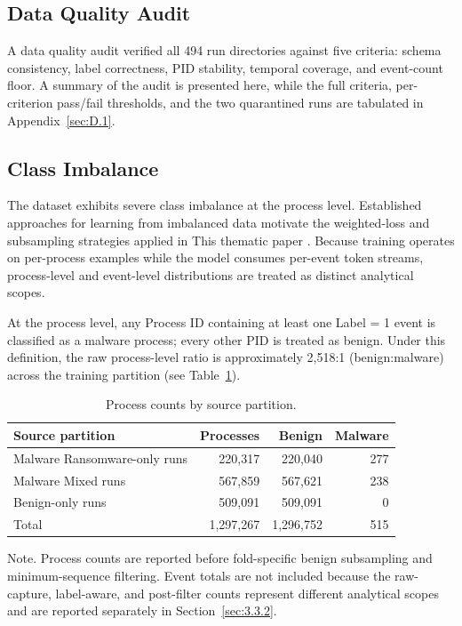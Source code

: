 \subsection{Data Quality Audit}\label{sec:3.3.4}

A data quality audit verified all 494 run directories against five criteria: schema consistency, label correctness, PID stability, temporal coverage, and event-count floor. A summary of the audit is presented here, while the full criteria, per-criterion pass/\allowbreak{}fail thresholds, and the two quarantined runs are tabulated in Appendix~\ref{sec:D.1}.

\subsection{Class Imbalance}\label{sec:3.3.5}

The dataset exhibits severe class imbalance at the process level. Established approaches for learning from imbalanced data motivate the weighted-loss and subsampling strategies applied in This thematic paper \cite{ref49}. Because training operates on per-process examples while the model consumes per-event token streams, process-level and event-level distributions are treated as distinct analytical scopes.

At the process level, any Process ID containing at least one Label = 1 event is classified as a malware process; every other PID is treated as benign. Under this definition, the raw process-level ratio is approximately 2,518:1 (benign:malware) across the training partition (see Table~\ref{tab:3-4}).

\begin{table}[htbp]
\centering
\small
\caption{Process counts by source partition.}\label{tab:3-4}
\begin{tabularx}{\textwidth}{Xrrr}
\hline
\textbf{Source partition} & \textbf{Processes} & \textbf{Benign} & \textbf{Malware} \\
\hline
Malware Ransomware-only runs & 220,317 & 220,040 & 277 \\
Malware Mixed runs & 567,859 & 567,621 & 238 \\
Benign-only runs & 509,091 & 509,091 & 0 \\
Total & 1,297,267 & 1,296,752 & 515 \\
\hline
\end{tabularx}
\end{table}

Note. Process counts are reported before fold-specific benign subsampling and minimum-sequence filtering. Event totals are not included because the raw-capture, label-aware, and post-filter counts represent different analytical scopes and are reported separately in Section~\ref{sec:3.3.2}.

